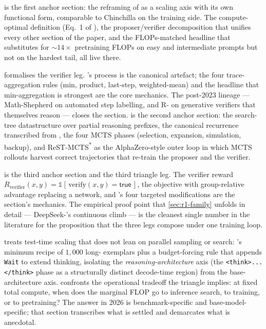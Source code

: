  is the first anchor section: the
\citet{snell2024} reframing of  as a scaling axis with
its own functional form, comparable to Chinchilla on the training
side. The compute-optimal definition (Eq.~1 of
\citet{snell2024}), the proposer/verifier decomposition that unifies
every other section of the paper, and the FLOPs-matched headline that
 substitutes for $\sim\!14\times$ pretraining FLOPs on
easy and intermediate prompts but not on the hardest tail, all live
there.

 formalises the verifier leg.
\citet{lightman2023-prm800k}'s process  is the canonical
artefact; the four trace-aggregation rules (min, product, last-step,
weighted-mean) and the headline that min-aggregation is strongest are
the core mechanics. The post-2023  lineage --- Math-Shepherd
on automated step labelling,  and R- on generative
verifiers that themselves reason --- closes the section.
 is the second anchor section: the search-tree
datastructure over partial reasoning prefixes, the canonical 
recurrence transcribed from \citet{rstar-math2025}, the four MCTS
phases (selection, expansion, simulation, backup), and ReST-MCTS\textsuperscript{*}
as the AlphaZero-style outer loop in which MCTS rollouts harvest
correct trajectories that re-train the proposer and the verifier.

 is the third anchor section and the third
triangle leg. The verifier reward
$R_\mathrm{verifier}(x,y) = \mathbb{1}[\,\mathrm{verify}(x,y) =
\mathsf{true}\,]$, the  objective \citep[\S 4.1]{shao2024} with
group-relative advantage replacing a  network, and 's four
targeted modifications \citep[\S 2]{dapo2025} are the section's
mechanics. The empirical proof point that \cref{sec:r1-family} unfolds
in detail --- DeepSeek-'s continuous  climb --- is the
cleanest single number in the literature for the proposition that the
three legs compose under one training loop.

 treats test-time scaling that does not lean
on parallel sampling or search: \citet{s1-2025}'s minimum recipe of
$1{,}000$ long- exemplars plus a budget-forcing rule that appends
\texttt{Wait} to extend thinking, isolating the
\emph{reasoning-architecture} axis (the \texttt{<think>...</think>}
phase as a structurally distinct decode-time region) from the
base-architecture axis.  confronts the
operational tradeoff the triangle implies: at fixed total compute,
when does the marginal FLOP go to inference search, to  training,
or to pretraining? The answer in 2026 is benchmark-specific and
base-model-specific; that section transcribes what is settled and
demarcates what is anecdotal.

